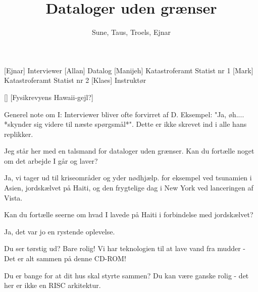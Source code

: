 \documentclass[a4paper,11pt]{article}
\title{Dataloger uden grænser}
\author{Sune, Taus, Troels, Ejnar}
\begin{document}
\maketitle

\begin{roles}
[Ejnar] Interviewer
[Allan] Datalog
[Manijeh] Katastroferamt Statist nr 1
[Mark] Katastroferamt Statist nr 2
[Klaes] Instruktør
\end{roles}

\begin{props}
[]
[Fysikrevyens Hawaii-gejl?]
\end{props}

\begin{sketch}

Generel note om I: Interviewer bliver ofte forvirret af D. Eksempel: "Ja, øh.... *skynder sig videre til næste spørgsmål*". Dette er ikke skrevet ind i alle hans replikker.


 Jeg står her med en talsmand for dataloger uden grænser. Kan du fortælle noget om det arbejde I går og laver?

 Ja, vi tager ud til kriseområder og yder nødhjælp. for eksempel ved tsunamien i Asien, jordskælvet på Haiti, og den frygtelige dag i New York  ved lanceringen af Vista.

 Kan du fortælle seerne om hvad I lavede på Haiti i forbindelse med jordskælvet?

 Ja, det var jo en   rystende oplevelse.



  Du ser tørstig ud? 
Bare rolig! Vi har teknologien til at lave vand fra mudder - Det er alt sammen på denne CD-ROM! 

  Du er bange for at dit hus skal styrte sammen? 
 Du kan være ganske rolig - det her er ikke en RISC arkitektur.


\end{sketch}
\end{document}
